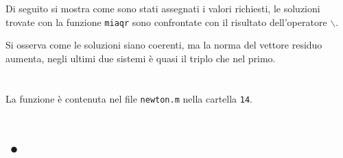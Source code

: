\documentclass[10pt,a4paper]{article}
\begin{document}
\section{}
Di seguito si mostra come sono stati assegnati i valori richiesti, le soluzioni trovate con la funzione \texttt{miaqr} sono confrontate con il risultato dell'operatore \texttt{$\backslash$}.

Si osserva come le soluzioni siano coerenti, ma la norma del vettore residuo aumenta, negli ultimi due sistemi è quasi il triplo che nel primo.\\
\section{}
La funzione è contenuta nel file \texttt{newton.m} nella cartella \texttt{14}.
\section{•}
\section{}

\section{}
\section{}
\section{}

\end{document}
